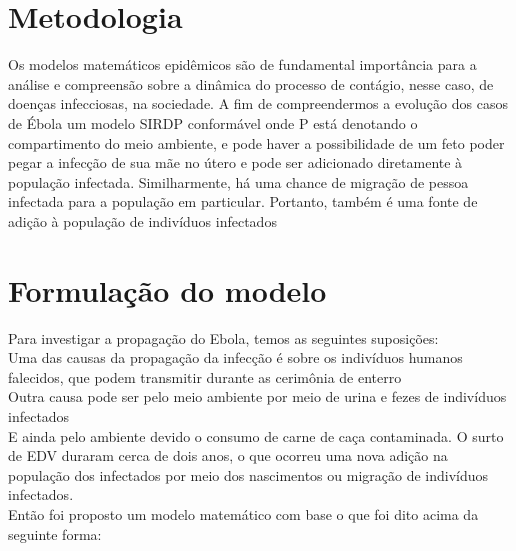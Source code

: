 \documentclass[12pt,a4paper]{article}
\begin{document}
\section*{Metodologia}
Os modelos matemáticos epidêmicos são de fundamental importância para a análise e compreensão sobre a dinâmica do processo de contágio, nesse caso, de doenças infecciosas, na sociedade. A fim de compreendermos a evolução dos casos de Ébola um modelo  SIRDP conformável onde P está denotando o compartimento do meio ambiente, e pode haver a possibilidade de um feto poder pegar a infecção de sua mãe no útero e pode ser adicionado diretamente à população infectada. Similharmente, há uma chance de migração de pessoa infectada para a população em particular. Portanto, também é uma fonte de adição à população de indivíduos infectados

\section*{Formulação do modelo}
Para investigar a propagação do Ebola, temos as seguintes suposições:\\
Uma das causas da propagação da infecção é sobre os indivíduos humanos falecidos, que podem transmitir durante as cerimônia de enterro\\
Outra causa pode ser pelo meio ambiente por meio de urina e fezes de indivíduos infectados\\
E ainda pelo ambiente devido o consumo de carne de caça contaminada. O surto de EDV duraram cerca de dois anos, o que ocorreu uma nova adição na população dos infectados por meio dos nascimentos ou migração de indivíduos infectados.\vspace{2mm}\\
Então foi proposto um modelo matemático com base o que foi dito acima da seguinte forma:\\
\end{document}

